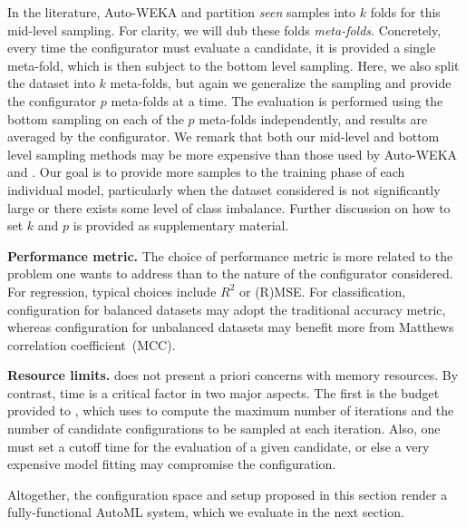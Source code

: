 In the literature, Auto-WEKA and \autosklearn partition \emph{seen} samples into $k$ folds for this mid-level sampling. For clarity, we will dub these folds \emph{meta-folds}. Concretely, every time the configurator must evaluate a candidate, it is provided a single meta-fold, which is then subject to the bottom level sampling. Here, we also split the dataset into $k$ meta-folds, but again we generalize the sampling and provide the configurator $p$ meta-folds at a time. The evaluation is performed using the bottom sampling on each of the $p$ meta-folds independently, and results are averaged by the configurator. We remark that both our mid-level and bottom level sampling methods may be more expensive than those used by Auto-WEKA and \autosklearn. Our goal is to provide more samples to the training phase of each individual model, particularly when the dataset considered is not significantly large or there exists some level of class imbalance. Further discussion on how to set $k$ and $p$ is provided as supplementary material.

\textbf{Performance metric.} The choice of performance metric is more related to the problem one wants to address than to the nature of the configurator considered. For regression, typical choices include $R^2$ or (R)MSE. For classification, configuration for balanced datasets may adopt the traditional accuracy metric, whereas configuration for unbalanced datasets may benefit more from Matthews correlation coefficient~(MCC).

\textbf{Resource limits.} \isklearn does not present a priori concerns with memory resources. By contrast, time is a critical factor in two major aspects. The first is the budget provided to \isklearn, which \irace uses to compute the maximum number of iterations and the number of candidate configurations to be sampled at each iteration. Also, one must set a cutoff time for the evaluation of a given candidate, or else a very expensive model fitting may compromise the configuration.

%

\medskip

Altogether, the configuration space and setup proposed in this section render \isklearn a fully-functional AutoML system, which we evaluate in the next section.
